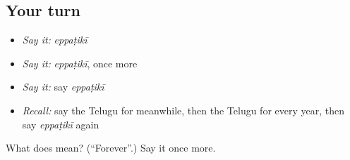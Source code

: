 \subsection*{Your turn}
\begin{itemize}
\raggedright
  \item \emph{Say it:} \emph{eppaṭikī}
  \item \emph{Say it:} \emph{eppaṭikī}, once more
  \item \emph{Say it:} say \emph{eppaṭikī}
  \item \emph{Recall:} say the Telugu for meanwhile, then the Telugu for every year, then say \emph{eppaṭikī} again
\end{itemize}

\begin{tcolorbox}[breakable,colback=teal!4,colframe=teal!35!black,title={Before you move on}]
What does  mean? (\textquotedblleft{}Forever\textquotedblright{}.) Say it once more.
\end{tcolorbox}
